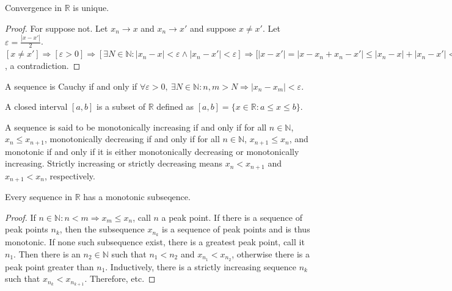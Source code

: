 \documentclass[crop=false,class=book,oneside]{standalone}
\begin{document}
            \begin{theorem}
            Convergence in $\mathbb{R}$ is unique.
            \end{theorem}
            \begin{proof}
            For suppose not. Let $x_n \rightarrow x$ and $x_n \rightarrow x'$ and suppose $x\ne x'$. Let $\varepsilon = \frac{|x-x'|}{2}$. $[x\ne x']\Rightarrow [\varepsilon>0]\Rightarrow [\exists N\in\mathbb{N}:|x_n-x|<\varepsilon\land |x_n-x'| <\varepsilon]\Rightarrow \big[|x-x'|=|x-x_n+x_n-x'|\leq |x_n-x|+|x_n-x'|<2\varepsilon = |x-x'|\big]$, a contradiction.
            \end{proof}
            \begin{definition}
            A sequence is Cauchy if and only if $\forall \varepsilon>0,\ \exists N\in \mathbb{N}: n,m>N\Rightarrow |x_n-x_m|<\varepsilon$.
            \end{definition}
            \begin{definition}
            A closed interval $[a,b]$ is a subset of $\mathbb{R}$ defined as $[a,b] = \{x\in\mathbb{R}:a\leq x\leq b\}$. 
            \end{definition}
            \begin{definition}
            A sequence is said to be monotonically increasing if and only if for all $n\in \mathbb{N}$, $x_n \leq x_{n+1}$, monotonically decreasing if and only if for all $n\in \mathbb{N}$, $x_{n+1} \leq x_{n}$, and monotonic if and only if it is either monotonically decreasing or monotonically increasing. Strictly increasing or strictly decreasing means $x_{n}<x_{n+1}$ and $x_{n+1}<x_n$, respectively.
            \end{definition}
            \begin{theorem}
            Every sequence in $\mathbb{R}$ has a monotonic subseqence.
            \end{theorem}
            \begin{proof}
            If $n\in \mathbb{N}:n<m\Rightarrow x_m \leq x_n$, call $n$ a peak point. If there is a sequence of peak points $n_k$, then the subsequence $x_{n_k}$ is a sequence of peak points and is thus monotonic. If none such subsequence exist, there is a greatest peak point, call it $n_1$. Then there is an $n_2\in \mathbb{N}$ such that $n_1 < n_2$ and $x_{n_1}< x_{n_2}$, otherwise there is a peak point greater than $n_1$. Inductively, there is a strictly increasing sequence $n_k$ such that $x_{n_k}< x_{n_{k+1}}$. Therefore, etc.
            \end{proof}
\end{document}
